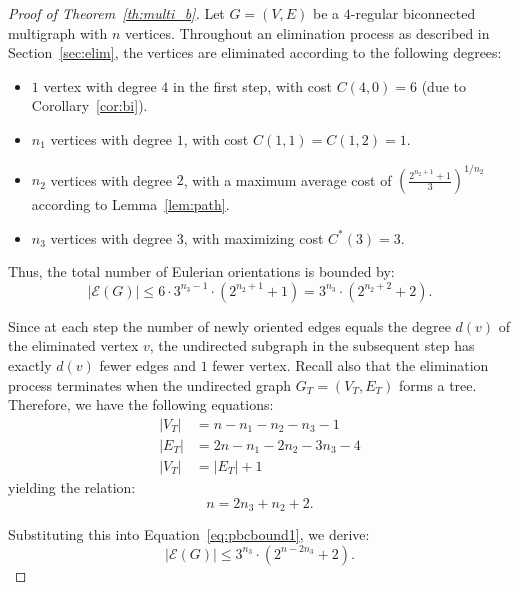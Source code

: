 \documentclass{article}
\begin{document}
        \begin{proof}[Proof of Theorem~\ref{th:multi_b}]
            Let $G=(V,E)$ be a $4$-regular biconnected multigraph with $n$ vertices.
            Throughout an elimination process as described in Section~\ref{sec:elim}, the vertices are eliminated according to the following degrees:
            \begin{itemize}
                \item $1$ vertex with degree $4$ in the first step, with cost $C(4,0)=6$ (due to Corollary~\ref{cor:bi}).
                \item $n_1$ vertices with degree $1$, with cost $C(1,1)=C(1,2)=1$.
                \item $n_2$ vertices with degree $2$, with a maximum average cost of $\left(\frac{2^{n_2+1}+1}{3}\right)^{1/n_2}$ according to Lemma~\ref{lem:path}.
                \item $n_3$ vertices with degree $3$, with maximizing cost $C^*(3)=3$.
            \end{itemize}
            Thus, the total number of Eulerian orientations is bounded by:
            \begin{equation}\label{eq:pbcbound1}
               |\mathcal{E}(G)| \leq 6\cdot 3^{n_3-1}\cdot \left( 2^{n_2+1}+1\right)= 3^{n_3}\cdot \left( 2^{n_2+2}+2\right).
            \end{equation}

            Since at each step the number of newly oriented edges equals the degree $d(v)$ of the eliminated vertex $v$, the undirected subgraph in the subsequent step has exactly $d(v)$ fewer edges and $1$ fewer vertex.
            Recall also that the elimination process terminates when the undirected graph $G_T=(V_T,E_T)$ forms a tree.
            Therefore, we have the following equations:
            \begin{align*}
              |V_T| &= n-n_1-n_2-n_3-1 \\
              |E_T| &= 2n-n_1-2n_2-3n_3-4\\
              |V_T| & = |E_T|+1
            \end{align*}
            yielding the relation:
            \begin{equation}\label{eq:tree_multi}
                n=2n_3+n_2+2.
            \end{equation}

        	Substituting this into Equation~\eqref{eq:pbcbound1}, we derive:
            \begin{equation}\label{eq:final_multi_1}
               |\mathcal{E}(G)| \leq 3^{n_3}\cdot \left( 2^{n-2n_3}+2 \right).
            \end{equation}


\end{proof}
\end{document}
